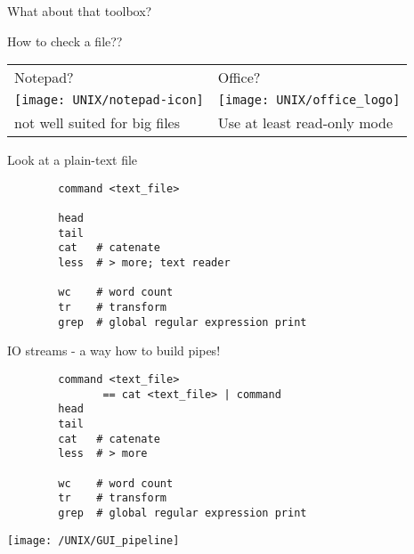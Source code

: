 \documentclass[xcolor=dvipsnames]{beamer}
\begin{document}
\begin{frame}
	\Huge
	\begin{center}
		What about that toolbox?	
	\end{center}
\end{frame}

\begin{frame}
	\begin{center}
	\huge
	How to check a file?? \\
	\vspace{1cm}
	
	\Large
	\begin{tabular}{C{0.4\textwidth}C{0.4\textwidth}}
	Notepad? & Office? \\
	\texttt{[image: UNIX/notepad-icon]} & \texttt{[image: UNIX/office\_logo]} \\
	\small not well suited for big files & \small Use at least read-only mode\\
	\end{tabular}
	\end{center}
\end{frame}

\begin{frame}[fragile]
	\huge
	Look at a plain-text file
	\Large
	\begin{verbatim}
		command <text_file>	
	
		head 
		tail 
		cat   # catenate
		less  # > more; text reader
		
		wc    # word count
		tr    # transform
		grep  # global regular expression print 
	\end{verbatim}
\end{frame}

\begin{frame}[fragile]
	\huge
	IO streams - a way how to build pipes!
	\Large
	\begin{verbatim}
		command <text_file> 
	           == cat <text_file> | command
		head 
		tail 
		cat   # catenate
		less  # > more
		
		wc    # word count
		tr    # transform
		grep  # global regular expression print 
	\end{verbatim}
\end{frame}

\begin{frame}
	\begin{center}
		\texttt{[image: /UNIX/GUI\_pipeline]}
	\end{center}
\end{frame}
\end{document}
